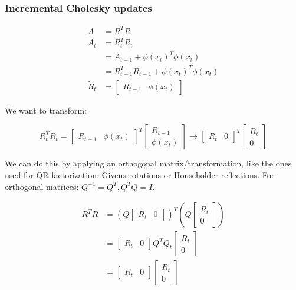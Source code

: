 \documentclass[a4paper]{article}
\begin{document}
\subsubsection*{Incremental Cholesky updates}

\begin{align*}
A &=R^T R \\
A_t &= R_t^T R_t \\
&= A_{t-1} + \phi(x_t)^T \phi(x_t) \\
&= R_{t-1}^T R_{t-1} + \phi(x_t)^T \phi(x_t) \\ 
\tilde{R}_t &= \begin{bmatrix}R_{t-1} & \phi(x_t) \end{bmatrix}
\end{align*}

We want to transform: 

$$R_t^T R_t = \begin{bmatrix} R_{t-1} & \phi(x_t) \end{bmatrix}^T \begin{bmatrix} R_{t-1} \\ \phi(x_t) \end{bmatrix} \rightarrow \begin{bmatrix} R_{t} & 0 \end{bmatrix}^T \begin{bmatrix} R_{t} \\ 0 \end{bmatrix}$$

We can do this by applying an orthogonal matrix/transformation, like the ones used for QR factorization: Givens rotations or Householder reflections. For orthogonal matrices: $Q^{-1}=Q^T, Q^T Q = I$.

\begin{align*}
R^T R &= (Q \begin{bmatrix} R_{t} & 0 \end{bmatrix})^T (Q \begin{bmatrix} R_{t} \\ 0 \end{bmatrix}) \\
&= \begin{bmatrix} R_{t} & 0 \end{bmatrix} Q^T Q_t \begin{bmatrix} R_{t} \\ 0 \end{bmatrix} \\
&= \begin{bmatrix} R_{t} & 0 \end{bmatrix} \begin{bmatrix} R_{t} \\ 0 \end{bmatrix}
\end{align*}
\end{document}
